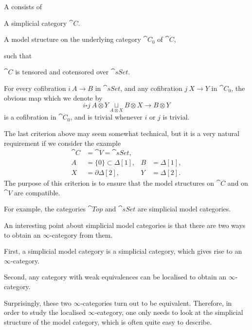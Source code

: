 \begin{definition}
    A  consists of 
    \begin{itms}
        \item A simplicial category $\cat{C}$.
        \item A model structure on the underlying category $\cat{C}_0$ of $\cat{C}$,
    \end{itms}
    such that
    \begin{itms}
        \item $\cat{C}$ is tensored and cotensored over $\cat{sSet}$.
        \item For every cofibration $i\:A\to B$ in $\cat{sSet}$,
        and any cofibration $j\:X\to Y$ in $\cat{C}_0$,
        the obvious map which we denote by
        \[ i \square j \: A \otimes Y \underset{A\otimes X}{\sqcup} B\otimes X \to B\otimes Y \]
        is a cofibration in $\cat{C}_0$,
        and is trivial whenever $i$ or $j$ is trivial.
    \end{itms}
\end{definition}

The last criterion above may seem somewhat technical,
but it is a very natural requirement if we consider the example 
\[ \begin{aligned}
    \cat{C} &= \cat{V} = \cat{sSet}, \\
    A &= \{0\} \subset \Delta[1], & B &= \Delta[1], \\
    X &= \partial\Delta[2], & Y &= \Delta[2].
\end{aligned} \]
The purpose of this criterion is to ensure that the model structures 
on $\cat{C}$ and on $\cat{V}$ are compatible.

For example, the categories $\cat{Top}$ and $\cat{sSet}$
are simplicial model categories.

An interesting point about simplicial model categories is that 
there are two ways to obtain an $\infty$-category from them.

\begin{itms}
    \item First, a simplicial model category is
    a simplicial category, which gives rise
    to an $\infty$-category.
    \item Second, any category with weak equivalences can be localised 
    to obtain an $\infty$-category.
\end{itms}
Surprisingly, these two $\infty$-categories turn out to be equivalent.
Therefore, in order to study the localised $\infty$-category,
one only needs to look at the simplicial structure of the model category,
which is often quite easy to describe.

